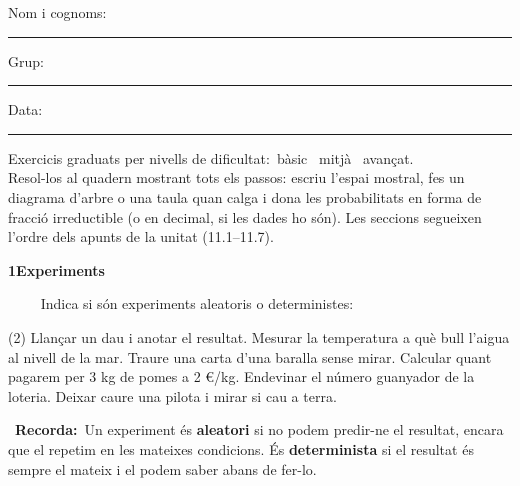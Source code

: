 \documentclass[11pt,a4paper]{article}
\newcommand{\estrelles}[1]{{\color{accent}\ifcase#1\or\faStar\faStar[regular]\faStar[regular]\or\faStar\faStar\faStar[regular]\or\faStar\faStar\faStar\fi}}
\newcounter{exer}
\newcommand{\ex}[1]{\par\needspace{4\baselineskip}\medskip\stepcounter{exer}\noindent{\color{navy}\bfseries\theexer.}\ \ {\small\estrelles{#1}}\ \ }
\newcommand{\seccio}[2]{\par\needspace{10\baselineskip}\bigskip
  \begin{tcolorbox}[colback=navy,colframe=navy,coltext=white,arc=2mm,boxrule=0pt,left=3mm,right=3mm,top=1.2mm,bottom=1.2mm]
  {\large\bfseries #1\quad #2}
  \end{tcolorbox}\vspace{-2pt}}
\newcommand{\recorda}[1]{\par\smallskip\begin{tcolorbox}[colback=accent!7,colframe=accent!55,arc=2mm,boxrule=0.5pt,left=2.5mm,right=2.5mm,top=1mm,bottom=1mm]\small{\color{accent}\faLightbulb[regular]}\ \textbf{Recorda:}\ #1\end{tcolorbox}}
\begin{document}
\thispagestyle{primera}

\vspace{10pt}
Nom i cognoms: \rule{8.4cm}{0.4pt}\hfill Grup: \rule{1.6cm}{0.4pt}\hfill Data: \rule{2.2cm}{0.4pt}
\vspace{8pt}

\begin{tcolorbox}[colback=soft,colframe=soft,arc=2mm,left=3mm,right=3mm,top=1.5mm,bottom=1.5mm]
\small Exercicis graduats per nivells de dificultat:\quad \estrelles{1}\ bàsic \qquad \estrelles{2}\ mitjà \qquad \estrelles{3}\ avançat.\\[2pt] Resol-los al quadern mostrant tots els passos: escriu l'espai mostral, fes un diagrama d'arbre o una taula quan calga i dona les probabilitats en forma de fracció irreductible (o en decimal, si les dades ho són). Les seccions segueixen l'ordre dels apunts de la unitat (11.1--11.7).
\end{tcolorbox}

\seccio{1}{Experiments}

\ex{1} Indica si són experiments aleatoris o deterministes:\begin{tasks}(2)
  \task Llançar un dau i anotar el resultat.
  \task Mesurar la temperatura a què bull l'aigua al nivell de la mar.
  \task Traure una carta d'una baralla sense mirar.
  \task Calcular quant pagarem per 3 kg de pomes a 2 €/kg.
  \task Endevinar el número guanyador de la loteria.
  \task Deixar caure una pilota i mirar si cau a terra.
\end{tasks}\recorda{Un experiment és \textbf{aleatori} si no podem predir-ne el resultat, encara que el repetim en les mateixes condicions. És \textbf{determinista} si el resultat és sempre el mateix i el podem saber abans de fer-lo.}
\end{document}
